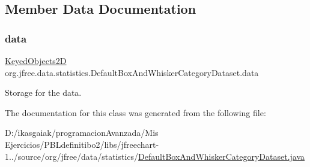 \subsection{Member Data Documentation}
\mbox{\label{classorg_1_1jfree_1_1data_1_1statistics_1_1_default_box_and_whisker_category_dataset_a0392ad3dc25ab5ed2a45ef4d8de14cb3}} 
\subsubsection{\texorpdfstring{data}{data}}
{\footnotesize\ttfamily \mbox{\hyperlink{classorg_1_1jfree_1_1data_1_1_keyed_objects2_d}{Keyed\+Objects2D}} org.\+jfree.\+data.\+statistics.\+Default\+Box\+And\+Whisker\+Category\+Dataset.\+data\hspace{0.3cm}{\ttfamily [protected]}}

Storage for the data. 

The documentation for this class was generated from the following file\+:\begin{DoxyCompactItemize}
\item 
D\+:/ikasgaiak/programacion\+Avanzada/\+Mis Ejercicios/\+P\+B\+Ldefinitibo2/libs/jfreechart-\/1../source/org/jfree/data/statistics/\mbox{\hyperlink{_default_box_and_whisker_category_dataset_8java}{Default\+Box\+And\+Whisker\+Category\+Dataset.\+java}}\end{DoxyCompactItemize}
